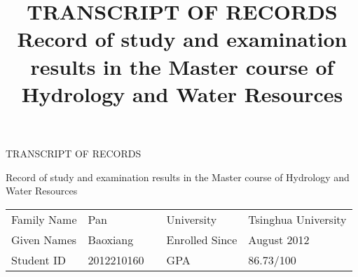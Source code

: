 \documentclass[a4paper,10pt,final]{scrartcl}
\title{\textbf{TRANSCRIPT OF RECORDS}\\[0.5em]
Record of study and examination results in the
Master course of Hydrology and Water Resources}
\author{}
\begin{document}

\begin{center}
	\begin{Huge}TRANSCRIPT OF RECORDS\end{Huge}

	\vspace{3em}

	\begin{Large}
		Record of study and examination results in the
Master course of Hydrology and Water Resources
	\end{Large}
\end{center}

\begin{center}
%
\begin{tabular}{llcll}

Family Name	& Pan& & University	& Tsinghua University \\
Given Names	& Baoxiang & &  Enrolled Since	& August 2012 \\


Student ID	& 2012210160 & & GPA	& 86.73/100  \\
\end{tabular}
\end{center}
\end{document}
